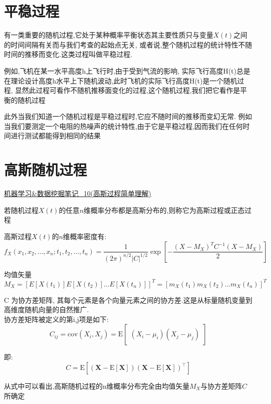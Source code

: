\documentclass{article}
\begin{document}
\section{平稳过程}
有一类重要的随机过程,它处于某种概率平衡状态其主要性质只与变量$X(t)$之间的时间间隔有关而与我们考查的起始点无关, 
或者说,整个随机过程的统计特性不随时间的推移而变化.这类过程叫做平稳过程.

\begin{example}
例如,飞机在某一水平高度h上飞行时,由于受到气流的影响,
实际飞行高度H(t)总是在理论设计高度h水平上下随机波动,此时飞机的实际飞行高度H(t)是一个随机过程,
显然此过程可看作不随机推移面变化的过程,这个随机过程,我们把它看作是平衡的随机过程
\end{example}

此外当我们知道一个随机过程是平稳过程时,它应不随时间的推移而变幻无常.
例如当我们要测定一个电阻的热噪声的统计特性,由于它是平稳过程,因而我们在任何时间进行测试都能得到相同的结果

\section{高斯随机过程}
\href{http://www.cnblogs.com/tornadomeet/archive/2013/06/14/3135380.html}{机器学习&数据挖掘笔记_10(高斯过程简单理解)}

若随机过程$X(t)$的任意$n$维概率分布都是高斯分布的,则称它为高斯过程或正态过程

高斯过程$X(t)$的$n$维概率密度有:
$$
f_X(x_1, x_2, \ldots, x_n; t_1, t_2, \ldots, t_n) = 
\frac{1}{(2\pi)^{n/2} |C|^{1/2}} \exp[- \frac{(X - M_X)^T C^{-1} (X - M_X)}{2}]
$$

均值矢量
$$ M_X = [E[X(t_1)] E[X(t_2)] \ldots E[X(t_n)]]^T = [m_X(t_1) m_X(t_2) \ldots m_X(t_n)]^T $$

C 为协方差矩阵, 其每个元素是各个向量元素之间的协方差.这是从标量随机变量到高维度随机向量的自然推广.\\
协方差矩阵被定义的第i,j项是如下:
$$ C_{ij} = \mathrm{cov}(X_i, X_j) = \mathrm{E}\begin{bmatrix} (X_i - \mu_i)(X_j - \mu_j) \end{bmatrix} $$

即:
$$
C=\mathrm{E}
\left[
 \left(
 \textbf{X} - \mathrm{E}[\textbf{X}]
 \right)
 \left(
 \textbf{X} - \mathrm{E}[\textbf{X}]
 \right)^\top
\right]
$$

从式中可以看出,高斯随机过程的n维概率分布完全由均值矢量$M_X$与协方差矩阵$C$所确定
\end{document}
